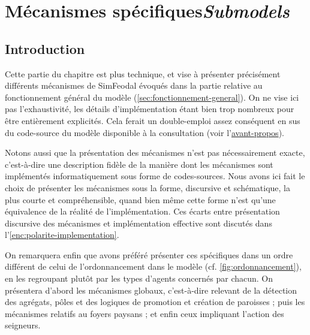 \let\orisectionmark\sectionmark
\renewcommand\sectionmark[1]{}%
\section[Mécanismes spécifiques -- \textit{Submodels}]{Mécanismes spécifiques\protect\newline \large{\textit{Submodels}}\label{sec:meca-specifiques}}
\orisectionmark{Mécanismes spécifiques}
\let\sectionmark\orisectionmark


\subsection{Introduction}

Cette partie du chapitre est plus technique, et vise à présenter précisément différents mécanismes de SimFeodal évoqués dans la partie relative au fonctionnement général du modèle (\cref{sec:fonctionnement-general}).
On ne vise ici pas l'exhaustivité, les détails d'implémentation étant bien trop nombreux pour être entièrement explicités.
Cela ferait un double-emploi assez conséquent en sus du code-source du modèle disponible à la consultation (voir l'\hyperlink{avant-propos}{avant-propos}).

Notons aussi que la présentation des mécanismes n'est pas nécessairement exacte, c'est-à-dire une description fidèle de la manière dont les mécanismes sont implémentés informatiquement sous forme de codes-sources.
Nous avons ici fait le choix de présenter les mécanismes sous la forme, discursive et schématique, la plus courte et compréhensible, quand bien même cette forme n'est qu'une \og équivalence\fg{} de la réalité de l'implémentation.
Ces écarts entre présentation discursive des mécanismes et implémentation effective sont discutés dans l'\cref{enc:polarite-implementation}.

On remarquera enfin que avons préféré présenter ces spécifiques dans un ordre différent de celui de l'ordonnancement dans le modèle (cf. \cref{fig:ordonnancement}), en les regroupant plutôt par les types d'agents concernés par chacun.
On présentera d'abord les mécanismes \og globaux\fg{}, c'est-à-dire relevant de la détection des agrégats, pôles et des logiques de promotion et création de paroisses ; puis les mécanismes relatifs au foyers paysans ; et enfin ceux impliquant l'action des seigneurs.

